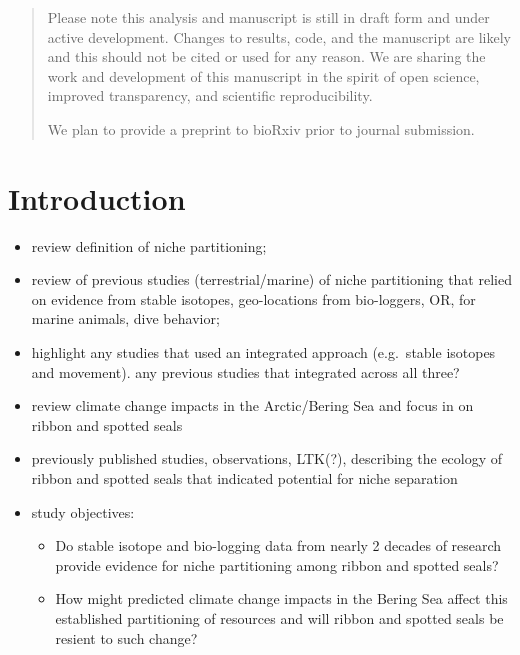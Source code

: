 \documentclass[
  letterpaper,
  DIV=11,
  numbers=noendperiod]{scrartcl}
\providecommand{\tightlist}{%
  \setlength{\itemsep}{0pt}\setlength{\parskip}{0pt}}\usepackage{longtable,booktabs,array}
\begin{document}
\begin{abstract}
\begin{tcolorbox}
Please note this analysis and manuscript is still in draft form and
under active development. Changes to results, code, and the manuscript
are likely and this should not be cited or used for any reason. We are
sharing the work and development of this manuscript in the spirit of
open science, improved transparency, and scientific reproducibility.

We plan to provide a preprint to bioRxiv prior to journal submission.

\end{tcolorbox}
\end{abstract}

\section{Introduction}\label{introduction}

\begin{itemize}
\tightlist
\item
  review definition of niche partitioning;
\item
  review of previous studies (terrestrial/marine) of niche partitioning
  that relied on evidence from stable isotopes, geo-locations from
  bio-loggers, OR, for marine animals, dive behavior;
\item
  highlight any studies that used an integrated approach (e.g.~stable
  isotopes and movement). any previous studies that integrated across
  all three?
\item
  review climate change impacts in the Arctic/Bering Sea and focus in on
  ribbon and spotted seals
\item
  previously published studies, observations, LTK(?), describing the
  ecology of ribbon and spotted seals that indicated potential for niche
  separation
\item
  study objectives:

  \begin{itemize}
  \tightlist
  \item
    Do stable isotope and bio-logging data from nearly 2 decades of
    research provide evidence for niche partitioning among ribbon and
    spotted seals?
  \item
    How might predicted climate change impacts in the Bering Sea affect
    this established partitioning of resources and will ribbon and
    spotted seals be resient to such change?
  \end{itemize}
\end{itemize}
\end{document}
